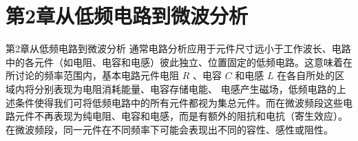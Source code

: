 \section{第2章\quad 从低频电路到微波分析}
\begin{frame}{第2章\quad 从低频电路到微波分析}
    通常电路分析应用于元件尺寸远小于工作波长、电路中的各元件（如电阻、电容和电感）彼此独立、位置固定的低频电路。这意味着在所讨论的频率范围内，基本电路元件电阻 $R$ 、电容 $C$ 和电感 $L$ 在各自所处的区域内将分别表现为电阻消耗能量、电容存储电能、
    电感产生磁场，低频电路的上述条件使得我们可将低频电路中的所有元件都视为集总元件。而在微波频段这些电路元件不再表现为纯电阻、电容和电感，而是有额外的阻抗和电抗（寄生效应）。在微波频段，同一元件在不同频率下可能会表现出不同的容性、感性或阻性。
\end{frame}

